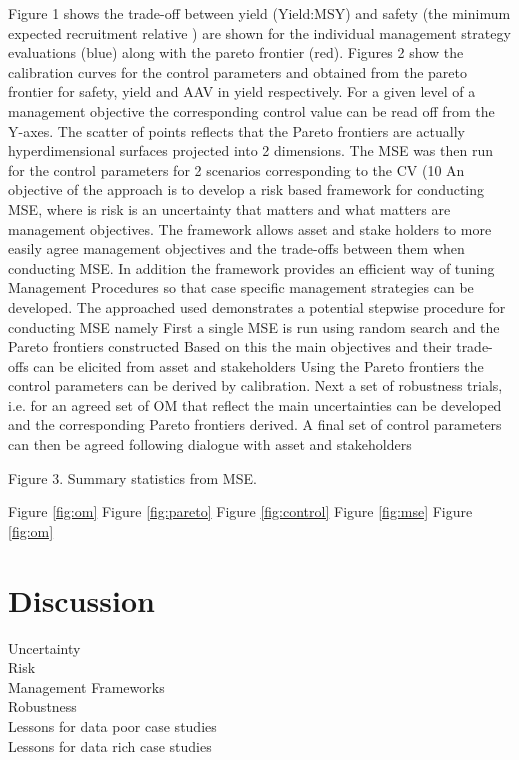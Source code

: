 \documentclass[12pt,doublespacing,a4paper]{ouparticle}
\begin{document}
Figure 1 shows the trade-off between yield (Yield:MSY) and safety (the minimum expected recruitment relative ) are shown for the individual management strategy evaluations (blue) along with the pareto frontier (red).
Figures 2 show the calibration curves for the control parameters  and  obtained from the pareto frontier for safety, yield and AAV in yield respectively. For a given level of a management objective the corresponding control value can be read off from the Y-axes. The scatter of points reflects that the Pareto frontiers are actually hyperdimensional surfaces projected into 2 dimensions.
The MSE was then run for the control parameters for 2 scenarios corresponding to the CV (10%
An objective of the approach is to develop a risk based framework for conducting MSE, where is risk is an uncertainty that matters and what matters are management objectives.  The framework allows asset and stake holders to more easily agree management objectives and the trade-offs between them when conducting MSE. In addition the framework provides an efficient way of tuning Management Procedures so that case specific management strategies can be developed.
The approached used demonstrates a potential stepwise procedure for conducting MSE namely
First a single MSE is run using random search and the Pareto frontiers constructed
Based on this the main objectives and their trade-offs can be elicited from asset and stakeholders
Using the Pareto frontiers the control parameters can be derived by calibration.
Next a set of robustness trials, i.e. for an agreed set of OM that reflect the main uncertainties can be developed and the corresponding Pareto frontiers derived.
A final set of control parameters can then be agreed following dialogue with asset and stakeholders



Figure 3. Summary statistics from MSE.

Figure \ref{fig:om} 
Figure \ref{fig:pareto} 
Figure \ref{fig:control} 
Figure \ref{fig:mse} 
Figure \ref{fig:om} 


\section{Discussion}


\begin{description}
 \item[Uncertainty]  
 \item[Risk]     
 \item[Management Frameworks] 
 \item[Robustness]
 \item[Lessons for data poor case studies]  
 \item[Lessons for data rich case studies] 
\end{description}
\end{document}
